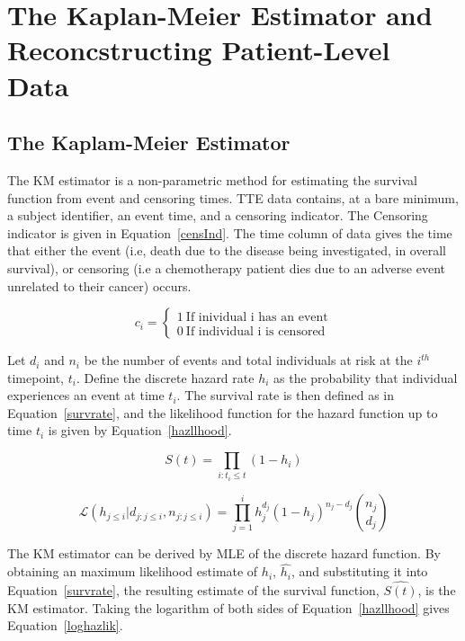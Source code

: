 \section{The Kaplan-Meier Estimator and Reconcstructing Patient-Level Data}
\subsection{The Kaplam-Meier Estimator}
The KM estimator is a non-parametric method for estimating the survival function from event and censoring times. TTE data contains, at a bare minimum, a subject identifier, an event time, and a censoring indicator. The Censoring indicator is given in Equation~\ref{censInd}. The time column of data gives the time that either the event (i.e, death due to the disease being investigated, in overall survival), or censoring (i.e a chemotherapy patient dies due to an adverse event unrelated to their cancer) occurs.

\begin{equation}
    c_{i} = \begin{cases}
        1 \ \text{If inividual i has an event} \\
        0 \ \text{If individual i is censored}
    \end{cases}
    \label{censInd}  
\end{equation}

Let $d_i$ and $n_i$ be the number of events and total individuals at risk at the $i^{th}$ timepoint, $t_i$. Define the discrete hazard rate $h_i$ as the probability that individual experiences an event at time $t_i$. The survival rate is then defined as in Equation~\ref{survrate}, and the likelihood function for the hazard function up to time $t_i$ is given by Equation~\ref{hazllhood}.

\begin{equation}
    S(t) = \prod_{i:t_i \leq t} (1 - h_i)
    \label{survrate}
\end{equation}

\begin{equation}
    \mathcal{L}(h_{j\leq i}|d_{j:j\leq i}, n_{j:j\leq i}) = \prod_{j=1}^i h_j^{d_j}(1-h_j)^{n_j-d_j}\binom{n_j}{d_j}
    \label{hazllhood}
\end{equation}

The KM estimator can be derived by MLE of the discrete hazard function. By obtaining an maximum likelihood estimate of $h_i$, $\hat{h_i}$, and substituting it into Equation~\ref{survrate}, the resulting estimate of the survival function, $\hat{S(t)}$, is the KM estimator. Taking the logarithm of both sides of Equation~\ref{hazllhood} gives Equation~\ref{loghazlik}.

